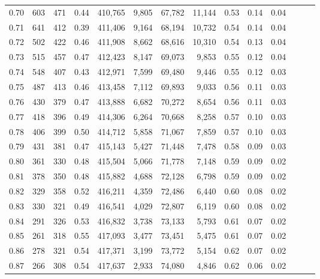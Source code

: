 \begin{tabular}{rrrrrrrrrrrrrr}
0.70 &     603 &    471 &  0.44 &  410,765 &    9,805 &  67,782 &  11,144 &  0.53 &  0.14 &      0.04 \\
0.71 &     641 &    412 &  0.39 &  411,406 &    9,164 &  68,194 &  10,732 &  0.54 &  0.14 &      0.04 \\
0.72 &     502 &    422 &  0.46 &  411,908 &    8,662 &  68,616 &  10,310 &  0.54 &  0.13 &      0.04 \\
0.73 &     515 &    457 &  0.47 &  412,423 &    8,147 &  69,073 &   9,853 &  0.55 &  0.12 &      0.04 \\
0.74 &     548 &    407 &  0.43 &  412,971 &    7,599 &  69,480 &   9,446 &  0.55 &  0.12 &      0.03 \\
0.75 &     487 &    413 &  0.46 &  413,458 &    7,112 &  69,893 &   9,033 &  0.56 &  0.11 &      0.03 \\
0.76 &     430 &    379 &  0.47 &  413,888 &    6,682 &  70,272 &   8,654 &  0.56 &  0.11 &      0.03 \\
0.77 &     418 &    396 &  0.49 &  414,306 &    6,264 &  70,668 &   8,258 &  0.57 &  0.10 &      0.03 \\
0.78 &     406 &    399 &  0.50 &  414,712 &    5,858 &  71,067 &   7,859 &  0.57 &  0.10 &      0.03 \\
0.79 &     431 &    381 &  0.47 &  415,143 &    5,427 &  71,448 &   7,478 &  0.58 &  0.09 &      0.03 \\
0.80 &     361 &    330 &  0.48 &  415,504 &    5,066 &  71,778 &   7,148 &  0.59 &  0.09 &      0.02 \\
0.81 &     378 &    350 &  0.48 &  415,882 &    4,688 &  72,128 &   6,798 &  0.59 &  0.09 &      0.02 \\
0.82 &     329 &    358 &  0.52 &  416,211 &    4,359 &  72,486 &   6,440 &  0.60 &  0.08 &      0.02 \\
0.83 &     330 &    321 &  0.49 &  416,541 &    4,029 &  72,807 &   6,119 &  0.60 &  0.08 &      0.02 \\
0.84 &     291 &    326 &  0.53 &  416,832 &    3,738 &  73,133 &   5,793 &  0.61 &  0.07 &      0.02 \\
0.85 &     261 &    318 &  0.55 &  417,093 &    3,477 &  73,451 &   5,475 &  0.61 &  0.07 &      0.02 \\
0.86 &     278 &    321 &  0.54 &  417,371 &    3,199 &  73,772 &   5,154 &  0.62 &  0.07 &      0.02 \\
0.87 &     266 &    308 &  0.54 &  417,637 &    2,933 &  74,080 &   4,846 &  0.62 &  0.06 &      0.02 \\

\end{tabular}
